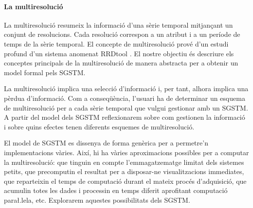 \paragraph{La multiresolució}
La multiresolució resumeix la informació d'una sèrie temporal
mitjançant un conjunt de resolucions. Cada resolució correspon a un
atribut i a un període de temps de la sèrie temporal.  El concepte de
multiresolució prové d'un estudi profund d'un sistema anomenat
RRDtool \parencite{rrdtool}. El nostre objectiu és descriure els
conceptes principals de la multiresolució de manera abstracta per a
obtenir un model formal pels \gls{SGSTM}.

La multiresolució implica una selecció d'informació i, per tant,
alhora implica una pèrdua d'informació. Com a conseqüència, l'usuari
ha de determinar un esquema de multiresolució per a cada sèrie
temporal que vulgui gestionar amb un \gls{SGSTM}. A partir del model
dels \gls{SGSTM} reflexionarem sobre com gestionen la informació i
sobre quins efectes tenen diferents esquemes de multiresolució.


El model de \gls{SGSTM} es dissenya de forma genèrica per a permetre'n
implementacions vàries. Així, hi ha vàries aproximacions possibles per
a computar la multiresolució: que tinguin en compte l'emmagatzematge
limitat dels sistemes petits, que precomputin el resultat per a
disposar-ne visualitzacions immediates, que reparteixin el temps de
computació durant el mateix procés d'adquisició, que acumulin totes
les dades i processin en temps diferit aprofitant computació
para\l.lela, etc.  
Explorarem aquestes possibilitats dels \gls{SGSTM}.










